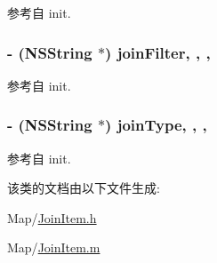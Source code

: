 参考自 init.

\hypertarget{interface_join_item_a2dfc110b26f4cf48aeae6cee0c1686ec}{
\subsubsection[{join\-Filter}]{\setlength{\rightskip}{0pt plus 5cm}-\/ (N\-S\-String $\ast$) join\-Filter\hspace{0.3cm}{\ttfamily [read]}, {\ttfamily [write]}, {\ttfamily [atomic]}, {\ttfamily [copy]}}}\label{interface_join_item_a2dfc110b26f4cf48aeae6cee0c1686ec}


参考自 init.

\hypertarget{interface_join_item_a6aa4f1788a48780bf34a84fa58253057}{
\subsubsection[{join\-Type}]{\setlength{\rightskip}{0pt plus 5cm}-\/ (N\-S\-String $\ast$) join\-Type\hspace{0.3cm}{\ttfamily [read]}, {\ttfamily [write]}, {\ttfamily [atomic]}, {\ttfamily [copy]}}}\label{interface_join_item_a6aa4f1788a48780bf34a84fa58253057}


参考自 init.



该类的文档由以下文件生成\-:\begin{DoxyCompactItemize}
\item 
Map/\hyperlink{_join_item_8h}{Join\-Item.\-h}\item 
Map/\hyperlink{_join_item_8m}{Join\-Item.\-m}\end{DoxyCompactItemize}

